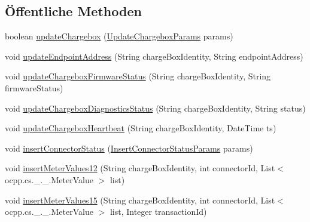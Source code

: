 \subsection*{Öffentliche Methoden}
\begin{DoxyCompactItemize}
\item 
boolean \hyperlink{interfacede_1_1rwth_1_1idsg_1_1steve_1_1repository_1_1_ocpp_server_repository_a48075ea356efeaab5fd480088a32e688}{update\+Chargebox} (\hyperlink{classde_1_1rwth_1_1idsg_1_1steve_1_1repository_1_1dto_1_1_update_chargebox_params}{Update\+Chargebox\+Params} params)
\item 
void \hyperlink{interfacede_1_1rwth_1_1idsg_1_1steve_1_1repository_1_1_ocpp_server_repository_abf41cab95009f461986a611f43e3f226}{update\+Endpoint\+Address} (String charge\+Box\+Identity, String endpoint\+Address)
\item 
void \hyperlink{interfacede_1_1rwth_1_1idsg_1_1steve_1_1repository_1_1_ocpp_server_repository_afbd7ab89a03cb005ab824b3ce84fbc30}{update\+Chargebox\+Firmware\+Status} (String charge\+Box\+Identity, String firmware\+Status)
\item 
void \hyperlink{interfacede_1_1rwth_1_1idsg_1_1steve_1_1repository_1_1_ocpp_server_repository_ade86b237d803f260a241497a561a96c0}{update\+Chargebox\+Diagnostics\+Status} (String charge\+Box\+Identity, String status)
\item 
void \hyperlink{interfacede_1_1rwth_1_1idsg_1_1steve_1_1repository_1_1_ocpp_server_repository_a8454728b389fe9bd86522d8d5c6199e2}{update\+Chargebox\+Heartbeat} (String charge\+Box\+Identity, Date\+Time ts)
\item 
void \hyperlink{interfacede_1_1rwth_1_1idsg_1_1steve_1_1repository_1_1_ocpp_server_repository_a169110fec80f4bca57c1c9ec39a8d104}{insert\+Connector\+Status} (\hyperlink{classde_1_1rwth_1_1idsg_1_1steve_1_1repository_1_1dto_1_1_insert_connector_status_params}{Insert\+Connector\+Status\+Params} params)
\item 
void \hyperlink{interfacede_1_1rwth_1_1idsg_1_1steve_1_1repository_1_1_ocpp_server_repository_afb15fceb9f5da8204816ad7cbc53bedc}{insert\+Meter\+Values12} (String charge\+Box\+Identity, int connector\+Id, List$<$ ocpp.\+cs.\+\_.\+\_.\+Meter\+Value $>$ list)
\item 
void \hyperlink{interfacede_1_1rwth_1_1idsg_1_1steve_1_1repository_1_1_ocpp_server_repository_abe132ff15dbaaa31a5838eeb110c6520}{insert\+Meter\+Values15} (String charge\+Box\+Identity, int connector\+Id, List$<$ ocpp.\+cs.\+\_.\+\_.\+Meter\+Value $>$ list, Integer transaction\+Id)

\end{DoxyCompactItemize}
